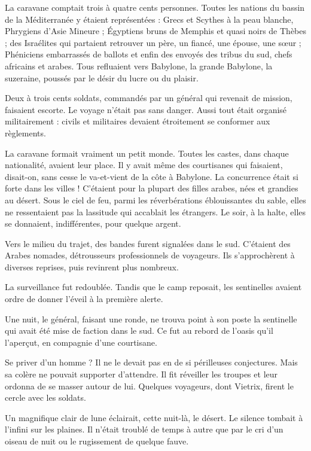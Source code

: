 \documentclass[a4paper, 11pt, oneside, polutonikogreek, french]{article}
\begin{document}
La caravane comptait trois à quatre cents personnes. Toutes les nations du bassin de la Méditerranée y étaient représentées : Grecs et Scythes à la peau blanche, Phrygiens d'Asie Mineure ; Égyptiens bruns de Memphis et quasi noirs de Thèbes ; des Israélites qui partaient retrouver un père, un fiancé, une épouse, une sœur ; Phéniciens embarrassés de ballots et enfin des envoyés des tribus du sud, chefs africains et arabes. Tous refluaient vers Babylone, la grande Babylone, la suzeraine, poussés par le désir du lucre ou du plaisir.

Deux à trois cents soldats, commandés par un général qui revenait de mission, faisaient escorte. Le voyage n'était pas sans danger. Aussi tout était organisé militairement : civils et militaires devaient étroitement se conformer aux règlements.

\bigskip
\centerline{\EightStarTaper}
\centerline{\EightStarTaper\EightStarTaper}
\bigskip

La caravane formait vraiment un petit monde. Toutes les castes, dans chaque nationalité, avaient leur place. Il y avait même des courtisanes qui faisaient, disait-on, sans cesse le va-et-vient de la côte à Babylone. La concurrence était si forte dans les villes ! C'étaient pour la plupart des filles arabes, nées et grandies au désert. Sous le ciel de feu, parmi les réverbérations éblouissantes du sable, elles ne ressentaient pas la lassitude qui accablait les étrangers. Le soir, à la halte, elles se donnaient, indifférentes, pour quelque argent.

Vers le milieu du trajet, des bandes furent signalées dans le sud. C'étaient des Arabes nomades, détrousseurs professionnels de voyageurs. Ils s'approchèrent à diverses reprises, puis revinrent plus nombreux.

La surveillance fut redoublée. Tandis que le camp reposait, les sentinelles avaient ordre de donner l'éveil à la première alerte.

Une nuit, le général, faisant une ronde, ne trouva point à son poste la sentinelle qui avait été mise de faction dans le sud. Ce fut au rebord de l'oasis qu'il l'aperçut, en compagnie d'une courtisane.

Se priver d'un homme ? Il ne le devait pas en de si périlleuses conjectures. Mais sa colère ne pouvait supporter d'attendre. Il fit réveiller les troupes et leur ordonna de se masser autour de lui. Quelques voyageurs, dont Vietrix, firent le cercle avec les soldats.

Un magnifique clair de lune éclairait, cette nuit-là, le désert. Le silence tombait à l'infini sur les plaines. Il n'était troublé de temps à autre que par le cri d'un oiseau de nuit ou le rugissement de quelque fauve.
\end{document}
